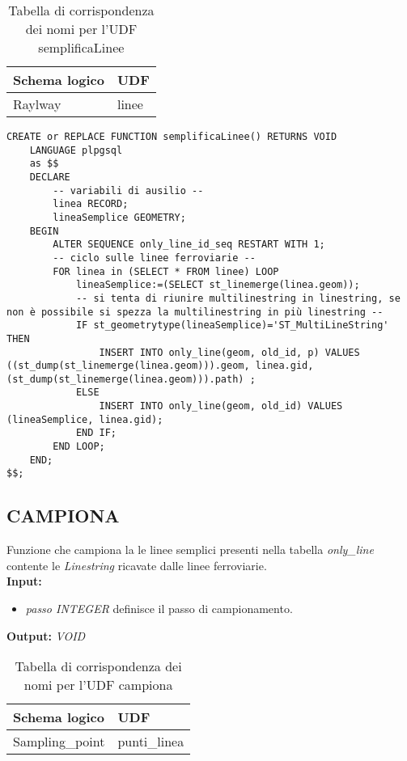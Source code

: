 \begin{table}[h]
\centering
\caption{Tabella di corrispondenza dei nomi per l'UDF semplificaLinee}
\label{mapTb4}
\begin{tabular}{|l|l|}
\hline
Schema logico       & UDF                \\ \hline
Raylway          & linee              \\ \hline
\end{tabular}
\end{table}

\begin{lstlisting}[style=mySQL]
CREATE or REPLACE FUNCTION semplificaLinee() RETURNS VOID
	LANGUAGE plpgsql
	as $$
	DECLARE
		-- variabili di ausilio --
		linea RECORD;
		lineaSemplice GEOMETRY;
	BEGIN
		ALTER SEQUENCE only_line_id_seq RESTART WITH 1;
		-- ciclo sulle linee ferroviarie --
		FOR linea in (SELECT * FROM linee) LOOP
			lineaSemplice:=(SELECT st_linemerge(linea.geom));
			-- si tenta di riunire multilinestring in linestring, se non è possibile si spezza la multilinestring in più linestring --
			IF st_geometrytype(lineaSemplice)='ST_MultiLineString' THEN
				INSERT INTO only_line(geom, old_id, p) VALUES ((st_dump(st_linemerge(linea.geom))).geom, linea.gid, (st_dump(st_linemerge(linea.geom))).path) ;
			ELSE
				INSERT INTO only_line(geom, old_id) VALUES (lineaSemplice, linea.gid);
			END IF;
		END LOOP;
	END;
$$;
\end{lstlisting}

\subsection{\textbf{CAMPIONA}}
Funzione che campiona la le linee semplici presenti nella tabella \textit{only\_line} contente le \textit{Linestring} ricavate dalle linee ferroviarie.\\
\textbf{Input:} 
\begin{itemize}
\item \textit{passo INTEGER} definisce il passo di campionamento.
\end{itemize}
\textbf{Output:} \textit{VOID} 

\begin{table}[h]
\centering
\caption{Tabella di corrispondenza dei nomi per l'UDF campiona}
\label{mapTb5}
\begin{tabular}{|l|l|}
\hline
Schema logico       & UDF                \\ \hline
Sampling\_point          & punti\_linea              \\ \hline
\end{tabular}
\end{table}

